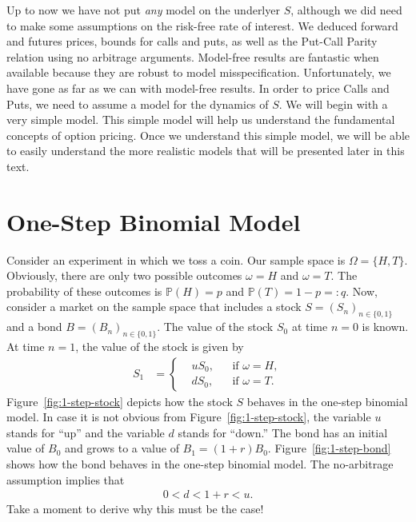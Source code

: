 \documentclass[12pt]{book}
\numberwithin{equation}{chapter}
\theoremstyle{plain}
\numberwithin{theorem}{section}
\theoremstyle{definition}
\numberwithin{exercise}{chapter}
\newcommand{\<}{\langle}
\renewcommand{\>}{\rangle}
\renewcommand{\(}{\left(}
\renewcommand{\)}{\right)}
\renewcommand{\[}{\left[}
\renewcommand{\]}{\right]}
\newcommand\Pb{\mathds{P}}
\newcommand\om{\omega}
\newcommand\Om{\Omega}
\theoremstyle{definition}
\numberwithin{question}{section}
\begin{document}
Up to now we have not put \textit{any} model on the underlyer $S$, although we did need to make some assumptions on the risk-free rate of interest.  We deduced forward and futures prices, bounds for calls and puts, as well as the Put-Call Parity relation using no arbitrage arguments. 
Model-free results are fantastic when available because they are robust to model misspecification. Unfortunately, we have gone as far as we can with model-free results. In order to price Calls and Puts, we need to assume a model for the dynamics of $S$.  We will begin with a very simple model.  This simple model will help us understand the fundamental concepts of option pricing.  Once we understand this simple model, we will be able to easily understand the more realistic models that will be presented later in this text.

\section{One-Step Binomial Model}
Consider an experiment in which we toss a coin.  Our sample space is $\Om = \{ H,T \}$.  Obviously, there are only two possible outcomes $\om = H$ and $\om = T$.  The probability of these outcomes is $\Pb(H) = p$ and $\Pb(T) = 1-p =: q$.  Now, consider a market on the sample space that includes a stock $S = (S_n)_{n \in \{0,1\}}$ and a bond $B = (B_n)_{n \in \{0,1\}}$.  The value of the stock $S_0$ at time $n=0$ is known.  At time $n=1$, the value of the stock is given by
\begin{align}
S_1
	&=	\left\{ \begin{aligned}
			&u S_0 , & &\text{if $\om = H$} , \\
			&d S_0 , & &\text{if $\om = T$} .
			\end{aligned} \right.
\end{align}
Figure~\ref{fig:1-step-stock} depicts how the stock $S$ behaves in the one-step binomial model.  In case it is not obvious from Figure~\ref{fig:1-step-stock}, the variable $u$ stands for ``up'' and the variable $d$ stands for ``down.''  
The bond has an initial value of $B_0$ and grows to a value of $B_1 = (1+r) B_0$.  
Figure~\ref{fig:1-step-bond} shows how the bond behaves in the one-step binomial model. 
The no-arbitrage assumption implies that 
\begin{align}
0 < d <  1+r  < u . \label{eq:no-arb}
\end{align}
Take a moment to derive why this must be the case!
\end{document}
